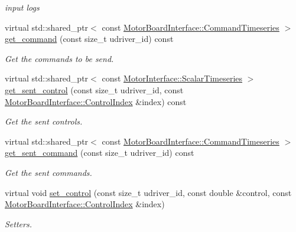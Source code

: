 \begin{DoxyCompactItemize}
\begin{DoxyCompactList}\small\item\em input logs \end{DoxyCompactList}\item 
virtual std\+::shared\+\_\+ptr$<$ const \hyperlink{classblmc__drivers_1_1MotorBoardInterface_ae2afe94a023d9f08a4c689e9b7660f15}{Motor\+Board\+Interface\+::\+Command\+Timeseries} $>$ \hyperlink{classblmc__drivers_1_1SpiBus_a70f133d24ab7de8efcea007eb73d78a1}{get\+\_\+command} (const size\+\_\+t udriver\+\_\+id) const
\begin{DoxyCompactList}\small\item\em Get the commands to be send. \end{DoxyCompactList}\item 
virtual std\+::shared\+\_\+ptr$<$ const \hyperlink{classblmc__drivers_1_1MotorInterface_a49b8fc916b9f9debbd7b0988463db5cd}{Motor\+Interface\+::\+Scalar\+Timeseries} $>$ \hyperlink{classblmc__drivers_1_1SpiBus_a2b94f55bf4a71e0d819653c99fe4bce9}{get\+\_\+sent\+\_\+control} (const size\+\_\+t udriver\+\_\+id, const \hyperlink{classblmc__drivers_1_1MotorBoardInterface_a82ed4d0fa527521707281396095a88ca}{Motor\+Board\+Interface\+::\+Control\+Index} \&index) const
\begin{DoxyCompactList}\small\item\em Get the sent controls. \end{DoxyCompactList}\item 
virtual std\+::shared\+\_\+ptr$<$ const \hyperlink{classblmc__drivers_1_1MotorBoardInterface_ae2afe94a023d9f08a4c689e9b7660f15}{Motor\+Board\+Interface\+::\+Command\+Timeseries} $>$ \hyperlink{classblmc__drivers_1_1SpiBus_ad1f3cdf8a05233b007a81f3752dc2a92}{get\+\_\+sent\+\_\+command} (const size\+\_\+t udriver\+\_\+id) const
\begin{DoxyCompactList}\small\item\em Get the sent commands. \end{DoxyCompactList}\item 
virtual void \hyperlink{classblmc__drivers_1_1SpiBus_a9cf14c27b226c454795cc1e508ae9a2f}{set\+\_\+control} (const size\+\_\+t udriver\+\_\+id, const double \&control, const \hyperlink{classblmc__drivers_1_1MotorBoardInterface_a82ed4d0fa527521707281396095a88ca}{Motor\+Board\+Interface\+::\+Control\+Index} \&index)
\begin{DoxyCompactList}\small\item\em Setters. \end{DoxyCompactList}\item 

\end{DoxyCompactItemize}
